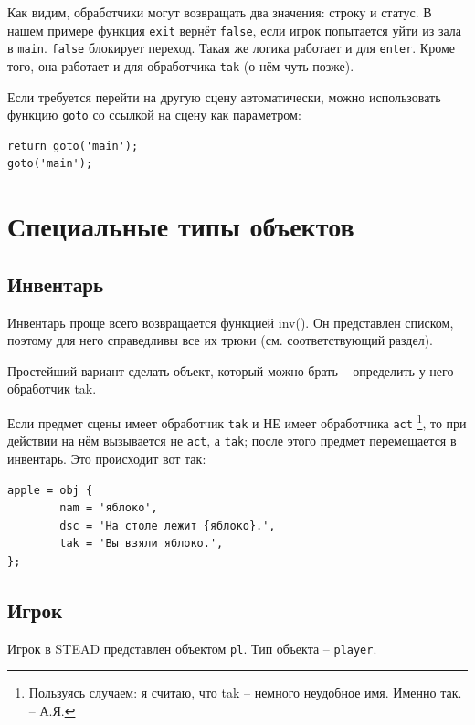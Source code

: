 \documentclass[12pt]{article}
\begin{document}
Как видим, обработчики могут возвращать два значения: строку и статус. В нашем примере функция \verb/exit/ вернёт \verb/false/, если игрок попытается уйти из зала в \verb/main/. \verb/false/ блокирует переход. Такая же логика работает и для \verb/enter/. Кроме того, она работает и для обработчика \verb/tak/ (о нём чуть позже).

Если требуется перейти на другую сцену автоматически, можно использовать функцию \verb/goto/ со ссылкой на сцену как параметром:

\begin{verbatim}
return goto('main');
goto('main');
\end{verbatim}

\section{Специальные типы объектов}

\subsection{Инвентарь}


Инвентарь проще всего возвращается функцией inv(). Он представлен списком, поэтому для него справедливы все их трюки (см. соответствующий раздел).

Простейший вариант сделать объект, который можно брать -- определить у него обработчик tak.

Если предмет сцены имеет обработчик \verb/tak/ и НЕ имеет обработчика \verb/act/ \footnote{Пользуясь случаем: я считаю, что tak -- немного неудобное имя. Именно так. -- А.Я.}, то при действии на нём вызывается не \verb/act/, а \verb/tak/; после этого предмет перемещается в инвентарь. Это происходит вот так:

\begin{verbatim}
apple = obj {
        nam = 'яблоко',
        dsc = 'На столе лежит {яблоко}.',
        tak = 'Вы взяли яблоко.',
};
\end{verbatim}

\subsection{Игрок}

Игрок в STEAD представлен объектом \verb/pl/. Тип объекта -- \verb/player/.
\end{document}

